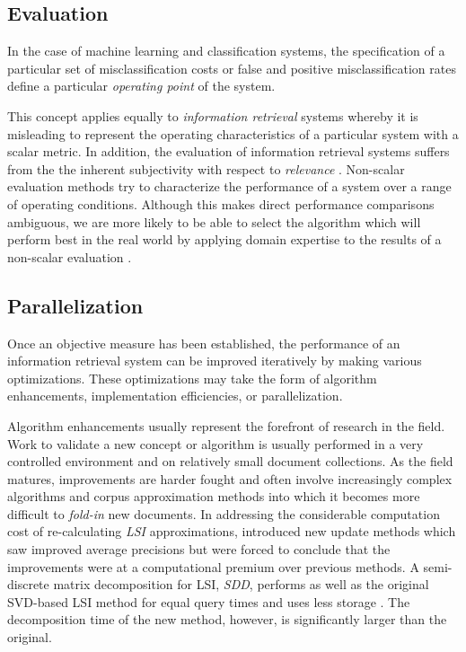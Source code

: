 \documentclass[10pt]{report}
\begin{document}
\subsection{Evaluation}
In the case of machine learning and classification systems, the
specification of a particular set of misclassification costs or false
and positive misclassification rates define a particular
\textit{operating point} of the system.

This concept applies equally to \textit{information retrieval} systems
whereby it is misleading to represent the operating characteristics of
a particular system with a scalar metric. In addition, the evaluation
of information retrieval systems suffers from the the inherent
subjectivity with respect to \textit{relevance}
\cite{RefWorks:72}. Non-scalar evaluation methods try to characterize
the performance of a system over a range of operating
conditions. Although this makes direct performance comparisons
ambiguous, we are more likely to be able to select the algorithm which
will perform best in the real world by applying domain expertise to
the results of a non-scalar evaluation \cite{RefWorks:32}.


\subsection{Parallelization}
Once an objective measure has been established, the performance of an
information retrieval system can be improved iteratively by making
various optimizations. These optimizations may take the form of
algorithm enhancements, implementation efficiencies, or
parallelization. 

Algorithm enhancements usually represent the forefront of research in
the field. Work to validate a new concept or algorithm is usually
performed in a very controlled environment and on relatively small
document collections. As the field matures, improvements are harder
fought and often involve increasingly complex algorithms and corpus
approximation methods into which it becomes more difficult to
\textit{fold-in} new documents. In addressing the considerable
computation cost of re-calculating \textit{LSI} \cite{RefWorks:102}
approximations, \cite{RefWorks:101} introduced new update methods
which saw improved average precisions but were forced to conclude that
the improvements were at a computational premium over previous
methods. A semi-discrete matrix decomposition for LSI, \textit{SDD},
performs as well as the original SVD-based LSI method for equal query
times and uses less storage \cite{RefWorks:99}. The decomposition time
of the new method, however, is significantly larger than the original.
\end{document}
